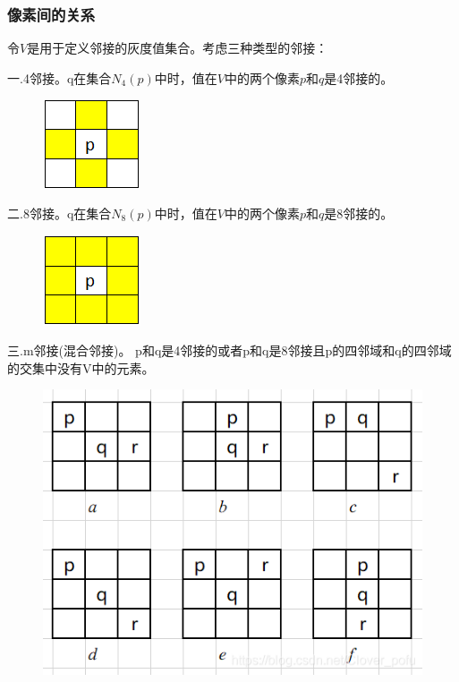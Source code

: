 \documentclass[11pt]{article}
\begin{document}
\subsubsection{像素间的关系}
令$V$是用于定义邻接的灰度值集合。考虑三种类型的邻接：

一.4邻接。q在集合$N_4(p)$中时，值在$V$中的两个像素$p$和$q$是4邻接的。
\begin{figure}[h]
	\centering
	\includegraphics[scale=0.4]{53}
\end{figure}

二.8邻接。q在集合$N_8(p)$中时，值在$V$中的两个像素$p$和$q$是8邻接的。
\begin{figure}[h]
	\centering
	\includegraphics[scale=0.4]{54}
\end{figure}

三.m邻接(混合邻接)。 p和q是4邻接的或者p和q是8邻接且p的四邻域和q的四邻域的交集中没有V中的元素。

\begin{figure}
	\centering
	\includegraphics[width=0.33\textheight]{55}
\end{figure}
\end{document}
